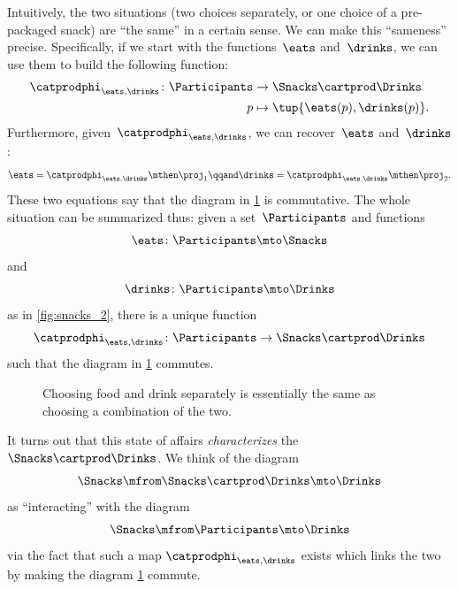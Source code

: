Intuitively, the two situations (two choices separately, or one choice of a pre-packaged snack) are ``the same'' in a certain sense.
We can make this ``sameness'' precise.
Specifically, if we start with the functions~$\eats$ and~$\drinks$, we can use them to build the following function:
\begin{equation}
    \label{eq:snacks-building-univ-map}
    \begin{aligned}
        \catprodphi_{\eats,\drinks}\colon \Participants & \to \Snacks\cartprod \Drinks \\
        p                                               & \mapsto \tup{\eats(p),\drinks(p)}.
    \end{aligned}
\end{equation}
Furthermore, given~$\catprodphi_{\eats,\drinks}$, we can recover~$\eats$ and~$\drinks$:
\begin{equation}
    \label{eq:snacks-proj-univ-map}
    \eats =\catprodphi_{\eats,\drinks}\mthen \proj_1 \qqand \drinks=\catprodphi_{\eats,\drinks}\mthen \proj_2.
\end{equation}
These two equations say that the diagram in \cref{fig:snacks_3} is commutative.
The whole situation can be summarized thus: given a set~$\Participants$ and functions
\begin{equation}
    \eats\colon \Participants \mto \Snacks
\end{equation}
and
\begin{equation}
    \drinks\colon \Participants \mto \Drinks
\end{equation}
as in \cref{fig:snacks_2}, there is a unique function
\begin{equation}
    \label{eq:snacks-unique-univ-map}
    \catprodphi_{\eats,\drinks} \colon \Participants \to \Snacks \cartprod \Drinks
\end{equation}
such that the diagram in \cref{fig:snacks_3} commutes.

\begin{figure}[h!]
    \centering
    \caption{Choosing food and drink separately is essentially the same as choosing a combination of the two. }
    \label{fig:snacks_3}
\end{figure}

It turns out that this state of affairs \emph{characterizes} the  $\Snacks\cartprod \Drinks$.
We think of the diagram
%
\begin{equation}
    \label{eq:snacks-prod-diagram}
    \Snacks \mfrom \Snacks \cartprod \Drinks \mto \Drinks
\end{equation}
as ``interacting'' with the diagram
\begin{equation}
    \label{eq:snacks-prod-test-diagram}
    \Snacks \mfrom \Participants \mto \Drinks
\end{equation}
via the fact that such a map $\catprodphi_{\eats,\drinks}$ exists which links the two by making the diagram \cref{fig:snacks_3} commute.

